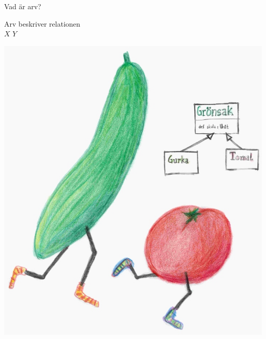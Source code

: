 





\begin{Slide}{Vad är arv?}

\begin{minipage}{0.4\textwidth}
\raggedright Arv  beskriver relationen \\
$X$  $Y$

\end{minipage}
\begin{minipage}{0.4\textwidth}
\includegraphics[width=1.5\textwidth]{../img/gurka-tomat-715x800}
\end{minipage}
\end{Slide}


